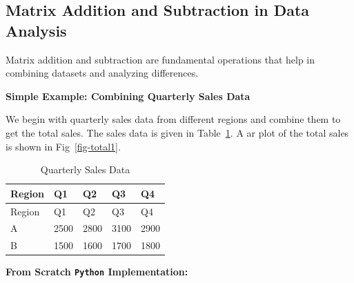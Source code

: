 \documentclass[
  letterpaper,
  DIV=11,
  numbers=noendperiod]{scrreprt}
\theoremstyle{plain}
\theoremstyle{definition}
\theoremstyle{remark}
\begin{document}
\subsection*{Matrix Addition and Subtraction in Data
Analysis}\label{matrix-addition-and-subtraction-in-data-analysis}

Matrix addition and subtraction are fundamental operations that help in
combining datasets and analyzing differences.

\textbf{Simple Example: Combining Quarterly Sales Data}

We begin with quarterly sales data from different regions and combine
them to get the total sales. The sales data is given in
Table~\ref{tbl-qtb}. A ar plot of the total sales is shown in
Fig~\ref{fig-total1}.

\begin{longtable}[]{@{}lllll@{}}
\caption{Quarterly Sales Data}\label{tbl-qtb}\tabularnewline
\toprule\noalign{}
Region & Q1 & Q2 & Q3 & Q4 \\
\midrule\noalign{}
\endfirsthead
\toprule\noalign{}
Region & Q1 & Q2 & Q3 & Q4 \\
\midrule\noalign{}
\endhead
\bottomrule\noalign{}
\endlastfoot
A & 2500 & 2800 & 3100 & 2900 \\
B & 1500 & 1600 & 1700 & 1800 \\
\end{longtable}

\textbf{From Scratch \texttt{Python} Implementation:}
\end{document}
